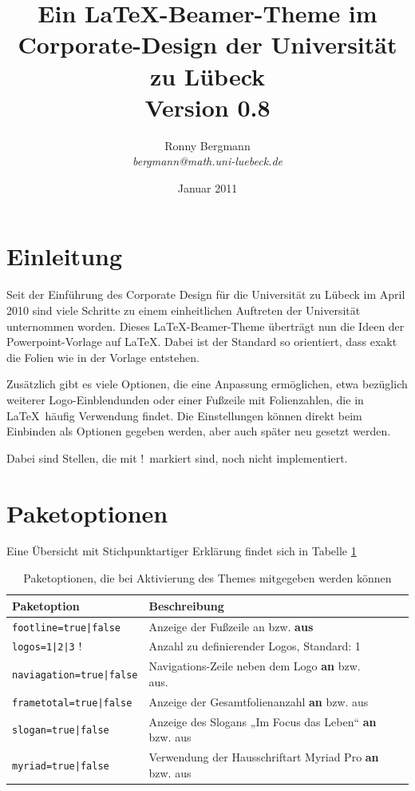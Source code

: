 \documentclass[a4paper,DIV=calc, oneside]{scrartcl}
\newcommand{\missing}{{\color{red}!}}
\begin{document}
	\thispagestyle{empty}
\title{Ein \LaTeX-Beamer-Theme im Corporate-Design der Universität zu Lübeck\\{\large\normalfont Version 0.8}}
\author{Ronny Bergmann\\\emph{bergmann@math.uni-luebeck.de}}
\date{Januar 2011}
\maketitle
\section{Einleitung}
Seit der Einführung des Corporate Design für die Universität zu Lübeck im April 2010 sind viele Schritte zu einem einheitlichen Auftreten der Universität unternommen worden. Dieses \LaTeX-Beamer-Theme überträgt nun die Ideen der
Powerpoint-Vorlage auf \LaTeX. Dabei ist der Standard so orientiert, dass exakt die Folien wie in der Vorlage entstehen.

Zusätzlich gibt es viele Optionen, die eine Anpassung ermöglichen, etwa bezüglich weiterer Logo-Einblendunden oder
einer Fußzeile mit Folienzahlen, die in \LaTeX\ häufig Verwendung findet. Die Einstellungen können direkt beim Einbinden als Optionen gegeben werden, aber auch später neu gesetzt werden.

Dabei sind Stellen, die mit \missing\  markiert sind, noch nicht implementiert.

\section{Paketoptionen}
Eine Übersicht mit Stichpunktartiger Erklärung findet sich in Tabelle \ref{tab:Paketoptionen}
\begin{table}
	\begin{tabular}{llll}
		\toprule
		\textbf{Paketoption} & \textbf{Beschreibung}\\\midrule
		\lstinline!footline=true|false! & Anzeige der Fußzeile an bzw. \textbf{aus}\\
		\lstinline!logos=1|2|3! \missing & Anzahl zu definierender Logos, Standard: 1\\
		\lstinline!naviagation=true|false! & Navigations-Zeile neben dem Logo \textbf{an} bzw. aus.\\
		\lstinline!frametotal=true|false! & Anzeige der Gesamtfolienanzahl \textbf{an} bzw. aus\\
		\lstinline!slogan=true|false! & Anzeige des Slogans „Im Focus das Leben“ \textbf{an} bzw. aus\\
		\lstinline!myriad=true|false! & Verwendung der Hausschriftart Myriad Pro \textbf{an} bzw. aus\\\bottomrule
	\end{tabular}
	\caption{Paketoptionen, die bei Aktivierung des Themes mitgegeben werden können}
	\label{tab:Paketoptionen}
\end{table}
\end{document}

